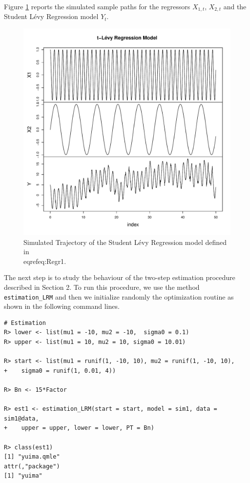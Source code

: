 Figure \ref{fig:SimulationMod1} reports the simulated sample paths for the regressors \(X_{1,t}\), \(X_{2,t}\) and the Student Lévy Regression model \(Y_{t}\).

\begin{figure}

{\centering \includegraphics[width=1\linewidth]{figures/Simulation_Mod1} 

}

\caption{Simulated Trajectory of the Student Lévy Regression model defined in \\eqref{eq:Regr1}.}\label{fig:SimulationMod1}
\end{figure}

The next step is to study the behaviour of the two-step estimation procedure described in Section 2. To run this procedure, we use the method \texttt{estimation\_LRM} and then we initialize randomly the optimization routine as shown in the following command lines.

\begin{verbatim}
# Estimation
R> lower <- list(mu1 = -10, mu2 = -10,  sigma0 = 0.1)
R> upper <- list(mu1 = 10, mu2 = 10, sigma0 = 10.01)

R> start <- list(mu1 = runif(1, -10, 10), mu2 = runif(1, -10, 10),
+    sigma0 = runif(1, 0.01, 4))

R> Bn <- 15*Factor

R> est1 <- estimation_LRM(start = start, model = sim1, data = sim1@data,
+    upper = upper, lower = lower, PT = Bn)

R> class(est1)
[1] "yuima.qmle"
attr(,"package")
[1] "yuima"
\end{verbatim}

